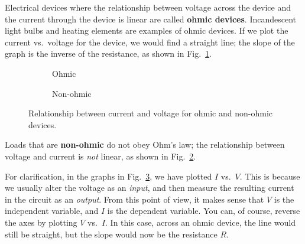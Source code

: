 Electrical devices where the relationship between voltage across the device and
the current through the device is linear are called \textbf{ohmic devices}.
Incandescent light bulbs and heating elements are examples of ohmic devices.
If we plot the current vs.\ voltage for the device, we would find a straight
line; the slope of the graph is the inverse of the resistance, as shown in
Fig.~\ref{fig:ohmic-relationship}.
\begin{figure}[ht]
  \centering
  \begin{subfigure}{.32\textwidth}
    \centering
    \caption{Ohmic}
    \label{fig:ohmic-relationship}
  \end{subfigure}
  \begin{subfigure}{.32\textwidth}
    \centering
    \caption{Non-ohmic}
    \label{fig:non-ohmic-relationship}
  \end{subfigure}
  \caption{Relationship between current and voltage for ohmic and non-ohmic
    devices.}
  \label{fig:i-vs-v-diagrams}
\end{figure}
Loads that are \textbf{non-ohmic} do not obey Ohm's law; the relationship
between voltage and current is \emph{not} linear, as shown in
Fig.~\ref{fig:non-ohmic-relationship}.
\begin{remark}
  For clarification, in the graphs in Fig.~\ref{fig:i-vs-v-diagrams}, we have
  plotted $I$ vs.\ $V$. This is because we usually alter the voltage as an
  \emph{input}, and then measure the resulting current in the circuit as an
  \emph{output}. From this point of view, it makes sense that $V$ is the
  independent variable, and $I$ is the dependent variable. You can, of course,
  reverse the axes by plotting $V$ vs.\ $I$. In this case, across an ohmic
  device, the line would still be straight, but the slope would now be the
  resistance $R$.
\end{remark}


